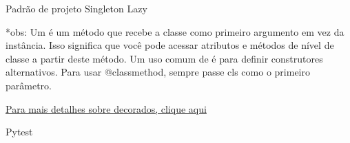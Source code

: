 \begin{frame}[t]{Padrão de projeto Singleton Lazy}
	
	
	
	*obs: Um \@classmethod é um método que recebe a classe como primeiro argumento em vez da instância. Isso significa que você pode acessar atributos e métodos de nível de classe a partir deste método. Um uso comum de \@classmethod é para definir construtores alternativos. Para usar @classmethod, sempre passe cls como o primeiro parâmetro.
	
	\href{https://peps.python.org/pep-0318/}{Para mais detalhes sobre decorados, clique aqui}
	
\end{frame}


\begin{frame}[t]{Pytest}

	\vspace{-0.5em}
	

\end{frame}

